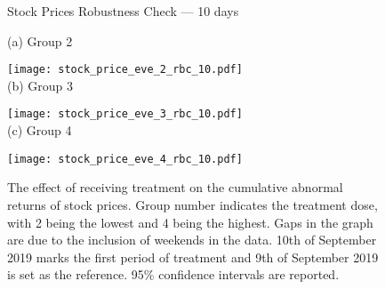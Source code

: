 \documentclass[12pt]{article}
\begin{document}
\begin{figure}
    \caption{Stock Prices Robustness Check --- 10 days}\label{fig:eve_stock_rbc_10}
    \centering
    
    (a) Group 2
    
    \texttt{[image: stock\_price\_eve\_2\_rbc\_10.pdf]} \\
    
    (b) Group 3
    
    \texttt{[image: stock\_price\_eve\_3\_rbc\_10.pdf]} \\
    
    (c) Group 4
    
    \texttt{[image: stock\_price\_eve\_4\_rbc\_10.pdf]}
    
    \captionsetup{font=footnotesize}
    \caption*{The effect of receiving treatment on the cumulative abnormal returns of stock prices. Group number indicates the treatment dose, with 2 being the lowest and 4 being the highest. Gaps in the graph are due to the inclusion of weekends in the data. 10th of September 2019 marks the first period of treatment and 9th of September 2019 is set as the reference. 95\% confidence intervals are reported.}
\end{figure}
\end{document}
